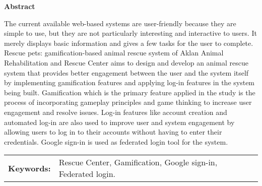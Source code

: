 \begin{center}
\textbf{Abstract}
\end{center}
\setlength{\parindent}{0pt}
The current available web-based systems are user-friendly because they are simple to use, but they are not particularly interesting and interactive to users. It merely displays basic information and gives a few tasks for the user to complete. Rescue pets: gamification-based animal rescue system of Aklan Animal Rehabilitation and Rescue Center aims to design and develop an animal rescue system that provides better engagement between the user and the system itself by implementing gamification features and applying log-in features in the system being built. Gamification which is the primary feature applied in the study is the process of incorporating gameplay principles and game thinking to increase user engagement and resolve issues. Log-in features like account creation and automated log-in are also used to improve user and system engagement by allowing users to log in to their accounts without having to enter their credentials. Google sign-in is used as federated login tool for the system.



\begin{tabular}{lp{4.75in}}
\hspace{-0.10em}\textbf{Keywords:}\hspace{0.5em} & Rescue Center, Gamification, Google sign-in, Federated login.\\
\end{tabular}
